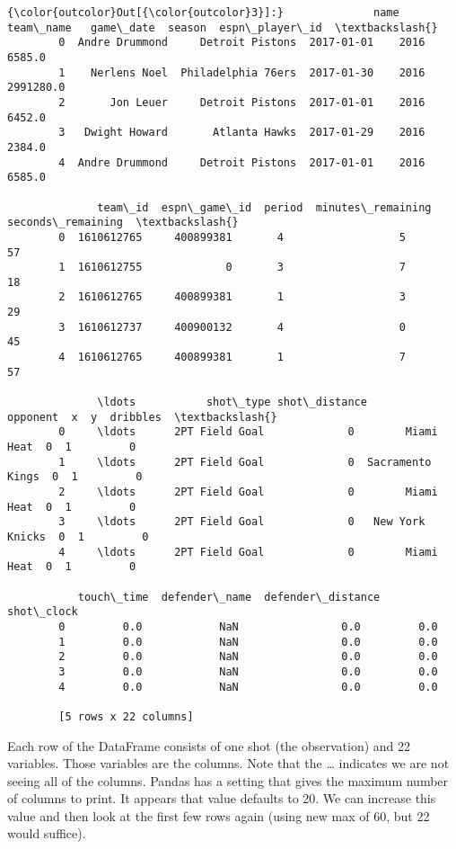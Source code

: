 \documentclass{article}
\begin{document}
            \begin{Verbatim}[commandchars=\\\{\}]
{\color{outcolor}Out[{\color{outcolor}3}]:}              name           team\_name   game\_date  season  espn\_player\_id  \textbackslash{}
        0  Andre Drummond     Detroit Pistons  2017-01-01    2016          6585.0   
        1    Nerlens Noel  Philadelphia 76ers  2017-01-30    2016       2991280.0   
        2       Jon Leuer     Detroit Pistons  2017-01-01    2016          6452.0   
        3   Dwight Howard       Atlanta Hawks  2017-01-29    2016          2384.0   
        4  Andre Drummond     Detroit Pistons  2017-01-01    2016          6585.0   
        
              team\_id  espn\_game\_id  period  minutes\_remaining  seconds\_remaining  \textbackslash{}
        0  1610612765     400899381       4                  5                 57   
        1  1610612755             0       3                  7                 18   
        2  1610612765     400899381       1                  3                 29   
        3  1610612737     400900132       4                  0                 45   
        4  1610612765     400899381       1                  7                 57   
        
              \ldots           shot\_type shot\_distance          opponent  x  y  dribbles  \textbackslash{}
        0     \ldots      2PT Field Goal             0        Miami Heat  0  1         0   
        1     \ldots      2PT Field Goal             0  Sacramento Kings  0  1         0   
        2     \ldots      2PT Field Goal             0        Miami Heat  0  1         0   
        3     \ldots      2PT Field Goal             0   New York Knicks  0  1         0   
        4     \ldots      2PT Field Goal             0        Miami Heat  0  1         0   
        
           touch\_time  defender\_name  defender\_distance  shot\_clock  
        0         0.0            NaN                0.0         0.0  
        1         0.0            NaN                0.0         0.0  
        2         0.0            NaN                0.0         0.0  
        3         0.0            NaN                0.0         0.0  
        4         0.0            NaN                0.0         0.0  
        
        [5 rows x 22 columns]
\end{Verbatim}
        
    Each row of the DataFrame consists of one shot (the observation) and 22
variables. Those variables are the columns. Note that the \ldots{}
indicates we are not seeing all of the columns. Pandas has a setting
that gives the maximum number of columns to print. It appears that value
defaults to 20. We can increase this value and then look at the first
few rows again (using new max of 60, but 22 would suffice).
\end{document}
